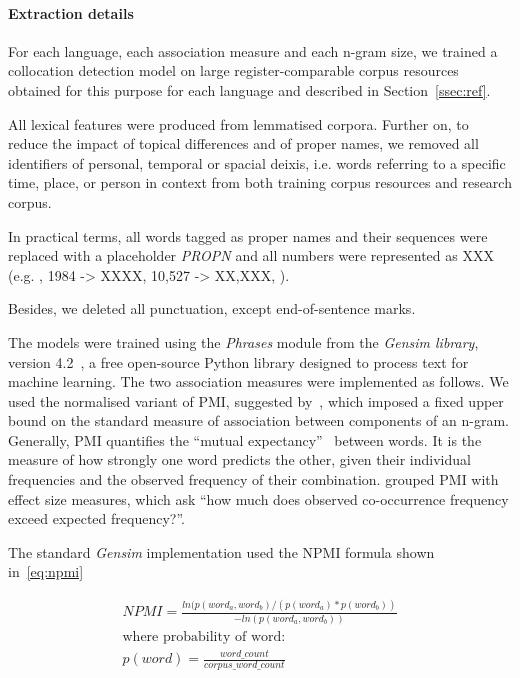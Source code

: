 \paragraph{Extraction details} For each language, each association measure and each n-gram size, we trained a collocation detection model on large register-comparable corpus resources obtained for this purpose for each language and described in Section~\ref{ssec:ref}.

All lexical features were produced from lemmatised corpora. 
Further on, to reduce the impact of topical differences and of proper names, we removed all identifiers of personal, temporal or spacial deixis, i.e. words referring to a specific time, place, or person in context from both training corpus resources and research corpus.

In practical terms, all words tagged as proper names and their sequences were replaced with a placeholder \textit{PROPN} and all numbers were represented as XXX (e.g. , 1984 -> XXXX, 10,527 -> XX,XXX, ). 

Besides, we deleted all punctuation, except end-of-sentence marks.

The models were trained using the \textit{Phrases} module from the \textit{Gensim library}, version 4.2~\cite{Rehurek2010}, a free open-source Python library designed to process text for machine learning.
The two association measures were implemented as follows. 
We used the normalised variant of \gls{PMI}, suggested by~\citet{Bouma2009}, which imposed a fixed upper bound on the standard measure of association between components of an n-gram. Generally, PMI quantifies the ``mutual expectancy''~\cite[(Firth 1957, 181) as quoted in][]{Evert2009} between words. It is the measure of how strongly one word predicts the other, given their individual frequencies and the observed frequency of their combination. \cite{Evert2009} grouped PMI with effect size measures, which ask ``how much does observed co-occurrence frequency exceed expected frequency?''.

The standard \textit{Gensim} implementation used the NPMI formula shown in~\ref{eq:npmi}

\begin{equation}\label{eq:npmi}
\begin{split}
NPMI = \frac{ln(p(word_a, word_b) / (p(word_a)*p(word_b))}{ -ln(p(word_a, word_b))} \\
\text{where probability of word:}\\
p(word) = \frac{word\_count}{corpus\_word\_count}
\end{split}
\end{equation}

